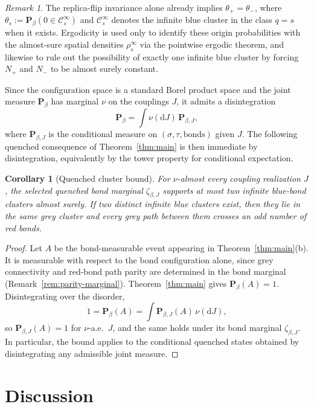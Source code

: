 \documentclass[11pt]{article}
\newtheorem{corollary}[theorem]{Corollary}
\numberwithin{theorem}{section}
\theoremstyle{remark}
\newtheorem{remark}[theorem]{Remark}
\begin{document}
\begin{remark}
The replica-flip invariance alone already implies $\theta_+ = \theta_-$, where $\theta_s := \mathbf{P}_\beta(0 \in \mathcal{C}_s^\infty)$ and $\mathcal{C}_s^\infty$ denotes the infinite blue cluster in the class $q=s$ when it exists. Ergodicity is used only to identify these origin probabilities with the almost-sure spatial densities $\rho_s^\infty$ via the pointwise ergodic theorem, and likewise to rule out the possibility of exactly one infinite blue cluster by forcing $N_+$ and $N_-$ to be almost surely constant.
\end{remark}

Since the configuration space is a standard Borel product space and the joint measure $\mathbf{P}_\beta$ has marginal $\nu$ on the couplings $J$, it admits a disintegration
\[
  \mathbf{P}_\beta = \int \nu(\mathrm{d}J)\, \mathbf{P}_{\beta,J},
\]
where $\mathbf{P}_{\beta,J}$ is the conditional measure on $(\sigma, \tau, \text{bonds})$ given $J$.
The following quenched consequence of Theorem~\ref{thm:main} is then immediate by disintegration, equivalently by the tower property for conditional expectation.

\begin{corollary}[Quenched cluster bound]\label{cor:quenched}
For $\nu$-almost every coupling realization $J$, the selected quenched bond marginal $\zeta_{\beta,J}$ supports at most two infinite blue-bond clusters almost surely.
If two distinct infinite blue clusters exist, then they lie in the same grey cluster and every grey path between them crosses an odd number of red bonds.
\end{corollary}

\begin{proof}
Let $A$ be the bond-measurable event appearing in Theorem~\ref{thm:main}\textup{(b)}.
It is measurable with respect to the bond configuration alone, since grey connectivity and red-bond path parity are determined in the bond marginal (Remark~\ref{rem:parity-marginal}).
Theorem~\ref{thm:main} gives $\mathbf{P}_\beta(A) = 1$.
Disintegrating over the disorder,
\[
  1 = \mathbf{P}_\beta(A) = \int \mathbf{P}_{\beta,J}(A)\, \nu(\mathrm{d}J),
\]
so $\mathbf{P}_{\beta,J}(A) = 1$ for $\nu$-a.e.\ $J$, and the same holds under its bond marginal $\zeta_{\beta,J}$.
  In particular, the bound applies to the conditional quenched states obtained by disintegrating any admissible joint measure.
\end{proof}


\section{Discussion}\label{sec:discussion}
\end{document}
